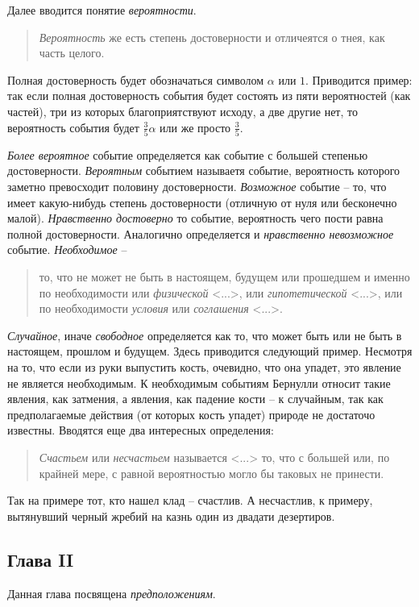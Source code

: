 \documentclass[12pt]{article}
\begin{document}
Далее вводится понятие \textit{вероятности}.
\begin{quote}
\textit{Вероятность} же есть степень достоверности и отличеятся о тнея, как часть целого.
\end{quote}
Полная достоверность будет обозначаться символом $\alpha$ или $1$. 
Приводится пример: так если полная достоверность события будет состоять из пяти вероятностей (как частей), три из которых благоприятствуют исходу, а две другие нет, то вероятность события будет $\frac{3}{5} \alpha$ или же просто $\frac{3}{5}$.

\textit{Более вероятное} событие определяется как событие с большей степенью достоверности.
\textit{Вероятным} событием называетя событие, вероятность которого заметно превосходит половину достоверности.
\textit{Возможное} событие -- то, что имеет какую-нибудь степень достоверности (отличную от нуля или бесконечно малой).
\textit{Нравственно достоверно} то событие, вероятность чего пости равна полной достоверности. 
Аналогично определяется и \textit{нравственно невозможное} событие.
\textit{Необходимое} -- 
\begin{quote}
то, что не может не быть в настоящем, будущем или прошедшем и именно по необходимости или \textit{физической} <...>, или \textit{гипотетической} <...>, или по необходимости \textit{условия} или \textit{соглашения} <...>.
\end{quote}
\textit{Случайное}, иначе \textit{свободное} определяется как то, что может быть или не быть в настоящем, прошлом и будущем.
Здесь приводится следующий пример. Несмотря на то, что если из руки выпустить кость, очевидно, что она упадет, это явление не является необходимым. К необходимым событиям Бернулли относит такие явления, как затмения, а явления, как падение кости -- к случайным, так как предполагаемые действия (от которых кость упадет) природе не достаточо известны.
Вводятся еще два интересных определения:
\begin{quote}
\textit{Счастьем} или \textit{несчастьем} называется <...> то, что с большей или, по крайней мере, с равной вероятностью могло бы таковых не принести.
\end{quote}
Так на примере тот, кто нашел клад -- счастлив. 
А несчастлив, к примеру, вытянувший черный жребий на казнь один из двадати дезертиров.

\subsection{Глава II}
Данная глава посвящена \textit{предположениям}.
\end{document}

